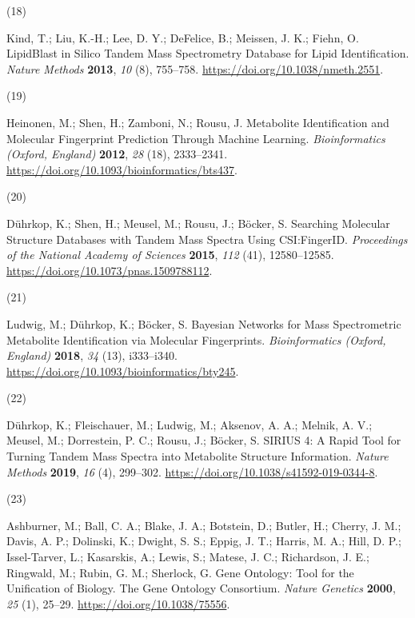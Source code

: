 \documentclass[
]{article}
\newlength{\cslhangindent}
\newlength{\csllabelwidth}
\newlength{\cslentryspacingunit} %
\newenvironment{CSLReferences}[2] %
 {%
  \setlength{\parindent}{0pt}
  \ifodd #1
  \let\oldpar\par
  \def\par{\hangindent=\cslhangindent\oldpar}
  \fi
  \setlength{\parskip}{#2\cslentryspacingunit}
 }%
 {}
\newcommand{\CSLLeftMargin}[1]{\parbox[t]{\csllabelwidth}{#1}}
\newcommand{\CSLRightInline}[1]{\parbox[t]{\linewidth - \csllabelwidth}{#1}\break}
\begin{document}
\begin{CSLReferences}{0}{0}
\leavevmode{}%
\CSLLeftMargin{(18) }%
\CSLRightInline{Kind, T.; Liu, K.-H.; Lee, D. Y.; DeFelice, B.; Meissen,
J. K.; Fiehn, O. {LipidBlast} in Silico Tandem Mass Spectrometry
Database for Lipid Identification. \emph{Nature Methods} \textbf{2013},
\emph{10} (8), 755--758. \url{https://doi.org/10.1038/nmeth.2551}.}

\leavevmode{}%
\CSLLeftMargin{(19) }%
\CSLRightInline{Heinonen, M.; Shen, H.; Zamboni, N.; Rousu, J.
Metabolite Identification and Molecular Fingerprint Prediction Through
Machine Learning. \emph{Bioinformatics (Oxford, England)} \textbf{2012},
\emph{28} (18), 2333--2341.
\url{https://doi.org/10.1093/bioinformatics/bts437}.}

\leavevmode{}%
\CSLLeftMargin{(20) }%
\CSLRightInline{Dührkop, K.; Shen, H.; Meusel, M.; Rousu, J.; Böcker, S.
Searching Molecular Structure Databases with Tandem Mass Spectra Using
{CSI}:{FingerID}. \emph{Proceedings of the National Academy of Sciences}
\textbf{2015}, \emph{112} (41), 12580--12585.
\url{https://doi.org/10.1073/pnas.1509788112}.}

\leavevmode{}%
\CSLLeftMargin{(21) }%
\CSLRightInline{Ludwig, M.; Dührkop, K.; Böcker, S. Bayesian Networks
for Mass Spectrometric Metabolite Identification via Molecular
Fingerprints. \emph{Bioinformatics (Oxford, England)} \textbf{2018},
\emph{34} (13), i333--i340.
\url{https://doi.org/10.1093/bioinformatics/bty245}.}

\leavevmode{}%
\CSLLeftMargin{(22) }%
\CSLRightInline{Dührkop, K.; Fleischauer, M.; Ludwig, M.; Aksenov, A.
A.; Melnik, A. V.; Meusel, M.; Dorrestein, P. C.; Rousu, J.; Böcker, S.
{SIRIUS} 4: A Rapid Tool for Turning Tandem Mass Spectra into Metabolite
Structure Information. \emph{Nature Methods} \textbf{2019}, \emph{16}
(4), 299--302. \url{https://doi.org/10.1038/s41592-019-0344-8}.}

\leavevmode{}%
\CSLLeftMargin{(23) }%
\CSLRightInline{Ashburner, M.; Ball, C. A.; Blake, J. A.; Botstein, D.;
Butler, H.; Cherry, J. M.; Davis, A. P.; Dolinski, K.; Dwight, S. S.;
Eppig, J. T.; Harris, M. A.; Hill, D. P.; Issel-Tarver, L.; Kasarskis,
A.; Lewis, S.; Matese, J. C.; Richardson, J. E.; Ringwald, M.; Rubin, G.
M.; Sherlock, G. Gene Ontology: Tool for the Unification of Biology.
{The Gene Ontology Consortium}. \emph{Nature Genetics} \textbf{2000},
\emph{25} (1), 25--29. \url{https://doi.org/10.1038/75556}.}


\end{CSLReferences}
\end{document}
